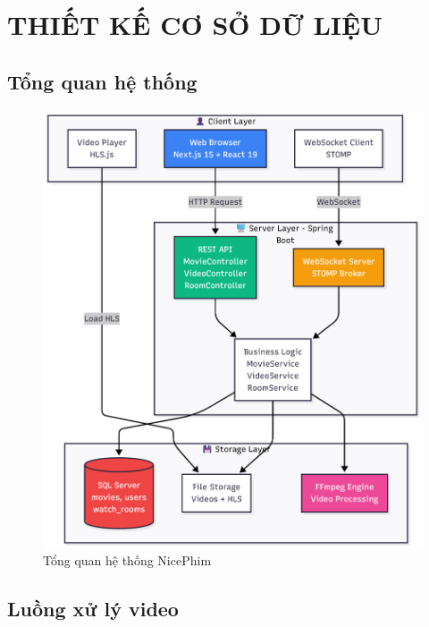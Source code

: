 \newpage
\section{\textbf{THIẾT KẾ CƠ SỞ DỮ LIỆU}}

\subsection{Tổng quan hệ thống}

\begin{figure}[H]
	\centering
	\includegraphics[width=1\textwidth]{image/mermaid/tongquahethong.png}
	\caption{Tổng quan hệ thống NicePhim}
	\label{fig:tongquahethong}
\end{figure}

\subsection{Luồng xử lý video}

